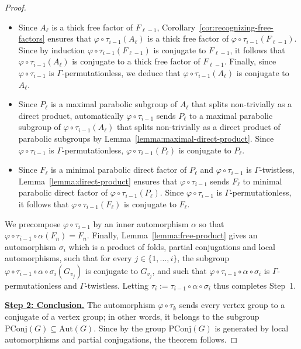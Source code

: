 \documentclass[a4paper,english,11pt]{article}
\theoremstyle{definition}
\theoremstyle{remark}
\newcommand{\Aut}{\mathrm{Aut}}
\newcommand{\PConj}{\mathrm{PConj}}
\begin{document}
\begin{proof}
\begin{itemize}
    \item Since $A_\ell$ is a thick free factor of $F_{\ell-1}$,  Corollary~\ref{cor:recognizing-free-factors} ensures that $\varphi\circ\tau_{i-1}(A_\ell)$ is a thick free factor of $\varphi\circ\tau_{i-1}(F_{\ell-1})$. Since by induction $\varphi\circ\tau_{i-1}(F_{\ell-1})$ is conjugate to $F_{\ell-1}$, it follows that $\varphi\circ\tau_{i-1}(A_\ell)$ is conjugate to a thick free factor of $F_{\ell-1}$. Finally, since $\varphi\circ\tau_{i-1}$ is $\Gamma$-permutationless, we deduce that $\varphi\circ\tau_{i-1}(A_\ell)$ is conjugate to $A_\ell$.  
    \item Since $P_\ell$ is a maximal parabolic subgroup of $A_\ell$ that splits non-trivially as a direct product, automatically $\varphi\circ\tau_{i-1}$ sends $P_\ell$ to a maximal parabolic subgroup of $\varphi\circ\tau_{i-1}(A_\ell)$ that splits non-trivially as a direct product of parabolic subgroups by Lemma~\ref{lemma:maximal-direct-product}. Since $\varphi\circ\tau_{i-1}$ is $\Gamma$-permutationless, $\varphi\circ\tau_{i-1}(P_\ell)$ is conjugate to $P_\ell$.
    \item Since $F_\ell$ is a minimal parabolic direct factor of $P_\ell$ and $\varphi\circ\tau_{i-1}$ is $\Gamma$-twistless, Lemma~\ref{lemma:direct-product} ensures that $\varphi\circ\tau_{i-1}$ sends $F_\ell$ to minimal parabolic direct factor of $\varphi\circ\tau_{i-1}(P_\ell)$. Since $\varphi\circ\tau_{i-1}$ is $\Gamma$-permutationless, it follows that $\varphi\circ\tau_{i-1}(F_\ell)$ is conjugate to $F_\ell$.
\end{itemize}

We precompose $\varphi\circ\tau_{i-1}$ by an inner automorphism $\alpha$ so that $\varphi\circ\tau_{i-1}\circ\alpha(F_n)=F_n$. Finally, Lemma~\ref{lemma:free-product} gives an automorphism $\sigma_i$ which is a product of folds, partial conjugations and local automorphisms, such that for every $j\in\{1,\dots,i\}$, the subgroup $\varphi\circ\tau_{i-1}\circ\alpha\circ\sigma_{i}(G_{v_j})$ is conjugate to $G_{v_j}$, and such that $\varphi\circ\tau_{i-1}\circ\alpha\circ\sigma_{i}$ is $\Gamma$-permutationless and $\Gamma$-twistless. Letting $\tau_i:=\tau_{i-1}\circ \alpha\circ\sigma_i$ thus completes Step~1. 

\medskip

\underline{\textbf{Step 2: Conclusion.}}
The automorphism $\varphi\circ\tau_k$ sends every vertex group to a conjugate of a vertex group; in other words, it belongs to the subgroup $\PConj(G)\subseteq\Aut(G)$. Since by \cite[Theorem~A]{GM} the group $\PConj(G)$ is generated by local automorphisms and partial conjugations, the theorem follows. 
\end{proof}
\end{document}
